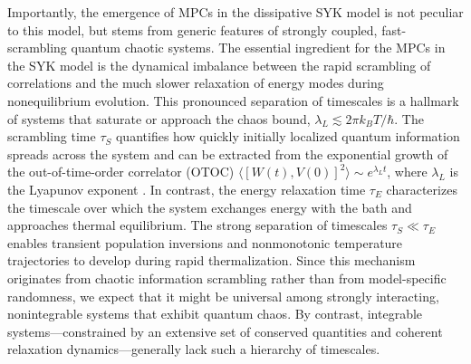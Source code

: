 \documentclass[prl,superscriptaddress,notitlepage,showpacs,twocolumn]{revtex4-2}
\begin{document}

Importantly, the emergence of MPCs in the dissipative SYK model is not peculiar to this model, but stems from generic features of strongly coupled, fast-scrambling quantum chaotic systems. The essential ingredient for the MPCs in the SYK model is the dynamical imbalance between the rapid scrambling of correlations and the much slower relaxation of energy modes during nonequilibrium evolution. This pronounced separation of timescales is a hallmark of systems that saturate or approach the chaos bound, \( \lambda_L \lesssim 2\pi k_B T/\hbar \). The scrambling time \( \tau_S \) quantifies how quickly initially localized quantum information spreads across the system and can be extracted from the exponential growth of the out-of-time-order correlator (OTOC) \( \langle [W(t),V(0)]^2 \rangle \sim e^{\lambda_L t} \), where \( \lambda_L \) is the Lyapunov exponent \cite{maldacena2016bound,polchinski2016spectrum,shenker2014multiple}. In contrast, the energy relaxation time \( \tau_E \) characterizes the timescale over which the system exchanges energy with the bath and approaches thermal equilibrium. The strong separation of timescales  \( \tau_S \ll \tau_E \) enables transient population inversions and nonmonotonic temperature trajectories to develop during rapid thermalization. Since this mechanism originates from chaotic information scrambling rather than from model-specific randomness, we expect that it might be universal among strongly interacting, nonintegrable systems that exhibit quantum chaos. By contrast, integrable systems—constrained by an extensive set of conserved quantities and coherent relaxation dynamics—generally lack such a hierarchy of timescales.
\end{document}
